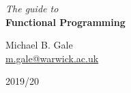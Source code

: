 
\begin{titlepage}
	\begin{center}
		
{\Huge \textit{The guide to}} \\[0.2cm]
{\Huge \textbf{Functional Programming}} \\[0.2cm]

\vfill

\scalebox{20.0}{$\lambda$}

\vfill 

{\LARGE Michael B. Gale} \\[0.1cm]
{\large \href{mailto:m.gale@warwick.ac.uk}{m.gale@warwick.ac.uk}}

\vspace{2cm}

{2019/20}
\end{center}
\end{titlepage}
